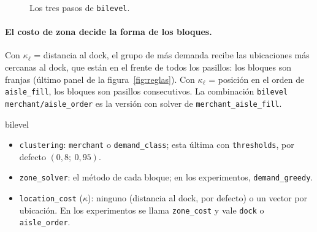 \documentclass[11pt,a4paper,oneside]{report}
\newcommand{\code}[1]{\texttt{\small #1}}
\begin{document}
\begin{figure}[ht]
\centering
{}
\caption{Los tres pasos de \code{bilevel}.}
\label{fig:bilevel}
\end{figure}

\paragraph{El costo de zona decide la forma de los bloques.} Con $\kappa_\ell$ = distancia al
dock, el grupo de más demanda recibe las ubicaciones más cercanas al dock, que están en el
frente de todos los pasillos: los bloques son franjas (último panel de la
figura~\ref{fig:reglas}). Con $\kappa_\ell$ = posición en el orden de \code{aisle\_fill}, los
bloques son pasillos consecutivos. La combinación \code{bilevel merchant/aisle\_order} es la
versión con solver de \code{merchant\_aisle\_fill}.

\begin{hiper}{bilevel}
\begin{itemize}
  \item \code{clustering}: \code{merchant} o \code{demand\_class}; esta última con
        \code{thresholds}, por defecto $(0{,}8;\ 0{,}95)$.
  \item \code{zone\_solver}: el método de cada bloque; en los experimentos,
        \code{demand\_greedy}.
  \item \code{location\_cost} ($\kappa$): ninguno (distancia al dock, por defecto) o un vector
        por ubicación. En los experimentos se llama \code{zone\_cost} y vale \code{dock} o
        \code{aisle\_order}.
\end{itemize}
\end{hiper}
\end{document}
